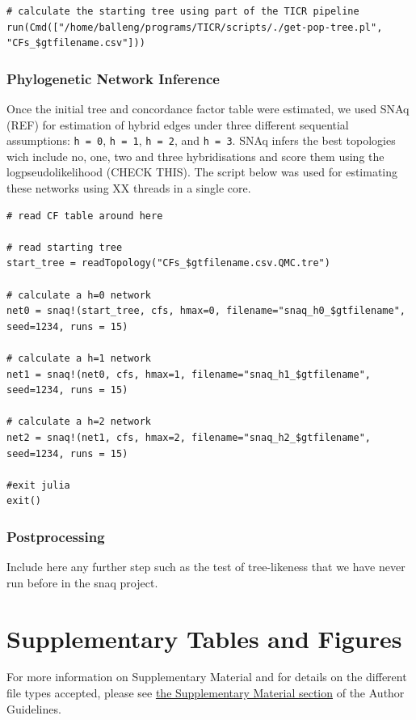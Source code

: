 \documentclass[utf8]{frontiers_suppmat} %
\begin{document}
\begin{verbatim}
# calculate the starting tree using part of the TICR pipeline
run(Cmd(["/home/balleng/programs/TICR/scripts/./get-pop-tree.pl", "CFs_$gtfilename.csv"]))
\end{verbatim}

\subsubsection{Phylogenetic Network Inference}

Once the initial tree and concordance factor table were estimated, we used SNAq (REF) for estimation of hybrid edges under three different sequential assumptions: \texttt{h = 0}, \texttt{h = 1}, \texttt{h = 2}, and \texttt{h = 3}. SNAq infers the best topologies wich include no, one, two and three hybridisations and score them using the logpseudolikelihood (CHECK THIS). The script below was used for estimating these networks using XX threads in a single core.

\begin{verbatim}
# read CF table around here

# read starting tree
start_tree = readTopology("CFs_$gtfilename.csv.QMC.tre")

# calculate a h=0 network
net0 = snaq!(start_tree, cfs, hmax=0, filename="snaq_h0_$gtfilename", seed=1234, runs = 15)

# calculate a h=1 network
net1 = snaq!(net0, cfs, hmax=1, filename="snaq_h1_$gtfilename", seed=1234, runs = 15)

# calculate a h=2 network
net2 = snaq!(net1, cfs, hmax=2, filename="snaq_h2_$gtfilename", seed=1234, runs = 15)

#exit julia
exit()
\end{verbatim}

\subsubsection{Postprocessing}

Include here any further step such as the test of tree-likeness that we have never run before in the snaq project.

\section{Supplementary Tables and Figures}

For more information on Supplementary Material and for details on the different file types accepted, please see \href{http://home.frontiersin.org/about/author-guidelines#SupplementaryMaterial}{the Supplementary Material section} of the Author Guidelines.
\end{document}
